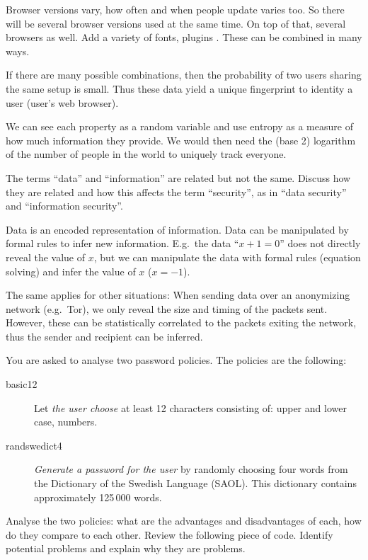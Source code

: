 \begin{solution}
  Browser versions vary, how often and when people update varies too.
  So there will be several browser versions used at the same time.
  On top of that, several browsers as well.
  Add a variety of fonts, plugins \etc.
  These can be combined in many ways.

  If there are many possible combinations, then the probability of two users 
  sharing the same setup is small.
  Thus these data yield a unique fingerprint to identity a user (\ie user's web 
  browser).

  We can see each property as a random variable and use entropy as a measure of 
  how much information they provide.
  We would then need the (base 2) logarithm of the number of people in the world 
  to uniquely track everyone.
\end{solution}
\question[3]
  The terms \enquote{data} and \enquote{information} are related but not the 
  same.
  Discuss how they are related and how this affects the term 
  \enquote{security}, as in \enquote{data security} and \enquote{information 
  security}.

  \begin{solution}
  Data is an encoded representation of information.
  Data can be manipulated by formal rules to infer new information.
  E.g.\ the data \enquote{\(x+1 = 0\)} does not directly reveal the value of 
  \(x\), but we can manipulate the data with formal rules (equation solving) 
  and infer the value of \(x\) (\(x = -1\)).

  The same applies for other situations:
  When sending data over an anonymizing network (e.g.\ Tor), we only reveal the 
  size and timing of the packets sent.
  However, these can be statistically correlated to the packets exiting the 
  network, thus the sender and recipient can be inferred.
  \end{solution}
\question[3]
  You are asked to analyse two password policies.
  The policies are the following:
  \begin{description}
    \item[basic12]
      Let \emph{the user choose} at least 12 characters consisting of: upper 
      and lower case, numbers.
    \item[randswedict4]
      \emph{Generate a password for the user} by randomly choosing four words 
      from the Dictionary of the Swedish Language (SAOL).
      This dictionary contains approximately 125\,000 words.
  \end{description}
  Analyse the two policies: what are the advantages and disadvantages of each, 
  how do they compare to each other.
\question[3]
Review the following piece of code.
Identify potential problems and explain why they are problems.

